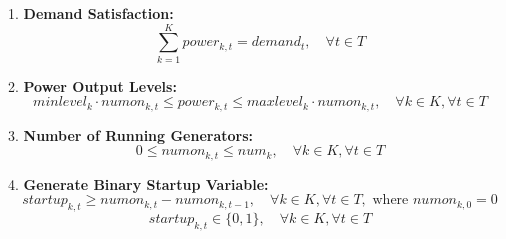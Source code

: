 \documentclass{article}
\begin{document}
1. \textbf{Demand Satisfaction:}
\[
\sum_{k=1}^{K} power_{k,t} = demand_{t}, \quad \forall t \in T
\]

2. \textbf{Power Output Levels:}
\[
minlevel_{k} \cdot numon_{k,t} \leq power_{k,t} \leq maxlevel_{k} \cdot numon_{k,t}, \quad \forall k \in K, \forall t \in T
\]

3. \textbf{Number of Running Generators:}
\[
0 \leq numon_{k,t} \leq num_{k}, \quad \forall k \in K, \forall t \in T
\]

4. \textbf{Generate Binary Startup Variable:}
\[
startup_{k,t} \geq numon_{k,t} - numon_{k,t-1}, \quad \forall k \in K, \forall t \in T, \text{ where } numon_{k,0} = 0
\]
\[
startup_{k,t} \in \{0, 1\}, \quad \forall k \in K, \forall t \in T
\]
\end{document}
